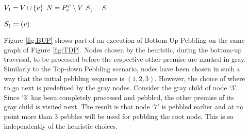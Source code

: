 \documentclass{llncs}
\newcommand{\nodedistance}{0.6cm}
\begin{document}
\begin{algorithm}[h]
	
	$V_1 = V \cup \{v\}$\;
	$N = P_{v}^{\psi} \setminus V$\;
	$S_1 = S$
	
	
	\Return $S_1 ::: (v)$\;
	
  \caption[.]{}
  \label{algo:visit}
\end{algorithm}

\begin{example}
Figure \ref{fig:BUP} shows part of an execution of Bottom-Up Pebbling on the same graph of Figure \ref{fig:TDP}.
Nodes chosen by the heuristic, during the bottom-up traversal, to be processed before the respective other premise are marked in gray. Similarly to the Top-down Pebbling scenario, nodes have been chosen in such a way that the initial pebbling sequence is $(1,2,3)$.
However, the choice of where to go next is predefined by the gray nodes. Consider the gray child of node `$3$'. Since `$3$' has been completely processed and pebbled, the other premise of its gray child is visited next. The result is that node `$7$' is pebbled earlier and at no point more than 3 pebbles will be used for pebbling the root node. This is so independently of the heuristic choices.


\end{example}
\end{document}
